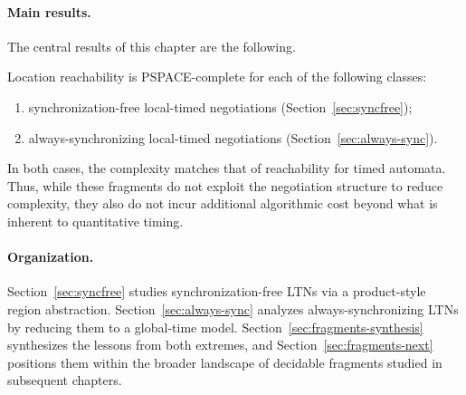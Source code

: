 \paragraph{Main results.}
The central results of this chapter are the following.

\begin{theorem}
\label{thm:chapter-results}
Location reachability is PSPACE-complete for each of the following classes:
\begin{enumerate}
\item synchronization-free local-timed negotiations (Section~\ref{sec:syncfree});
\item always-synchronizing local-timed negotiations (Section~\ref{sec:always-sync}).
\end{enumerate}
\end{theorem}

In both cases, the complexity matches that of reachability for timed automata.
Thus, while these fragments do not exploit the negotiation structure to reduce
complexity, they also do not incur additional algorithmic cost beyond what is
inherent to quantitative timing.

\paragraph{Organization.}
Section~\ref{sec:syncfree} studies synchronization-free LTNs via a product-style
region abstraction. Section~\ref{sec:always-sync} analyzes always-synchronizing
LTNs by reducing them to a global-time model. Section~\ref{sec:fragments-synthesis}
synthesizes the lessons from both extremes, and Section~\ref{sec:fragments-next}
positions them within the broader landscape of decidable fragments studied in
subsequent chapters.

